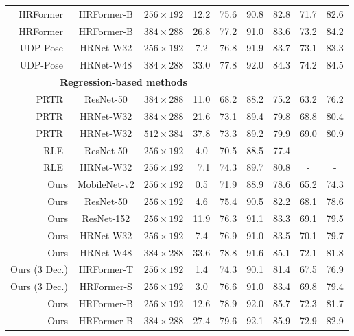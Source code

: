 \documentclass[runningheads]{llncs}
\begin{document}
\begin{table}[!t]
{\begin{tabular}{r |c|c|c|c|c|c|c|c}
        HRFormer~\cite{yuan2021hrformer}       & HRFormer-B       & $256\times192$ &  12.2        & 75.6 & 90.8 & 82.8 & 71.7 & 82.6 \\
        HRFormer~\cite{yuan2021hrformer}       & HRFormer-B       & $384\times288$ &  26.8        & 77.2 & 91.0 & 83.6 & 73.2 & 84.2 \\
        UDP-Pose~\cite{huang2020devil}           & HRNet-W32       & $256\times192$ &  7.2        & 76.8 & 91.9 & 83.7 & 73.1 & 83.3 \\
        UDP-Pose~\cite{huang2020devil}           & HRNet-W48       & $384\times288$ &  33.0        & 77.8 & 92.0 & 84.3 & 74.2 & 84.5 \\
        \hline
        \multicolumn{5}{c}{\textbf{Regression-based methods}} \\
	    \hline
PRTR~\cite{li2021PRTR}                      & ResNet-50  & $384\times288$ & 11.0     & 68.2 & 88.2 & 75.2 & 63.2 & 76.2 \\
	    PRTR~\cite{li2021PRTR}                      & HRNet-W32  & $384\times288$ & 21.6     & 73.1 & 89.4 & 79.8 & 68.8 & 80.4 \\
        PRTR~\cite{li2021PRTR}                      & HRNet-W32  & $512\times384$ & 37.8     & 73.3 & 89.2 & 79.9 & 69.0 & 80.9 \\
		RLE~\cite{li2021human}                      & ResNet-50         & $256\times192$ & 4.0      & 70.5 & 88.5 & 77.4 & -    &  -   \\
		RLE~\cite{li2021human}                      & HRNet-W32 & $256\times192$ & ~7.1 & 74.3 & 89.7& 80.8 & -   & - \\
		Ours                                        & MobileNet-v2         & $256\times192$ &  0.5   & 71.9 & 88.9 & 78.6 & 65.2 & 74.3 \\
Ours                                          & ResNet-50         & $256\times192$ &  4.6     & 75.4 & 90.5 & 82.2 & 68.1 & 78.6 \\ Ours                                          & ResNet-152      & $256\times192$ &  11.9    & 76.3 & 91.1 & 83.3 & 69.1 & 79.5 \\ Ours                                        & HRNet-W32         & $256\times192$ &   7.4   & 76.9 & 91.0 & 83.5 & 70.1 & 79.7 \\ Ours                                        & HRNet-W48         & $384\times288$ &   33.6   & 78.8 & 91.6 & 85.1 & 72.1 & 81.8 \\ Ours (3 Dec.)                               & HRFormer-T         & $256\times192$ &  1.4    & 74.3 & 90.1 & 81.4 & 67.5 & 76.9 \\ Ours (3 Dec.)                               & HRFormer-S         & $256\times192$ &  3.0     & 76.6 & 91.0 & 83.4 & 69.8 & 79.4 \\ Ours                                        & HRFormer-B         & $256\times192$ & 12.6     & 78.9 & 92.0 & 85.7 & 72.3 & 81.7 \\ Ours                                        & HRFormer-B         & $384\times288$ & 27.4     & 79.6 & 92.1 & 85.9 & 72.9 & 82.9 \\ \hline

\end{tabular}}
\end{table}
\end{document}
